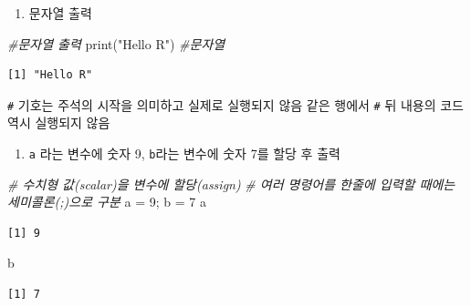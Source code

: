 \documentclass[
  11pt,
]{krantz}
\makeatletter
\newenvironment{Shaded}{\begin{snugshade}}{\end{snugshade}}
\newcommand{\CommentTok}[1]{\textcolor[rgb]{0.37,0.37,0.37}{\textit{#1}}}
\newcommand{\DecValTok}[1]{\textcolor[rgb]{0.06,0.06,0.06}{#1}}
\newcommand{\FunctionTok}[1]{\textcolor[rgb]{0,0,0}{#1}}
\newcommand{\NormalTok}[1]{#1}
\newcommand{\OtherTok}[1]{\textcolor[rgb]{0.37,0.37,0.37}{#1}}
\newcommand{\StringTok}[1]{\textcolor[rgb]{0.5,0.5,0.5}{#1}}
\providecommand{\tightlist}{%
  \setlength{\itemsep}{0pt}\setlength{\parskip}{0pt}}
\newenvironment{kframe}{%
\medskip{}
\setlength{\fboxsep}{.8em}
 \def\at@end@of@kframe{}%
 \ifinner\ifhmode%
  \def\at@end@of@kframe{\end{minipage}}%
  \begin{minipage}{\columnwidth}%
 \fi\fi%
 \def\FrameCommand##1{\hskip\@totalleftmargin \hskip-\fboxsep
 \colorbox{shadecolor}{##1}\hskip-\fboxsep
     \hskip-\linewidth \hskip-\@totalleftmargin \hskip\columnwidth}%
 \MakeFramed {\advance\hsize-\width
   \@totalleftmargin\z@ \linewidth\hsize
   \@setminipage}}%
 {\par\unskip\endMakeFramed%
 \at@end@of@kframe}
\renewenvironment{quote}{\begin{kframe}}{\end{kframe}}
\makeatother
\begin{document}
\begin{enumerate}
\def\labelenumi{\arabic{enumi}.}
\setcounter{enumi}{1}
\tightlist
\item
  문자열 출력
\end{enumerate}

\footnotesize

\begin{Shaded}
\begin{Highlighting}[]
\CommentTok{\#문자열 출력}
\FunctionTok{print}\NormalTok{(}\StringTok{"Hello R"}\NormalTok{) }\CommentTok{\#문자열}
\end{Highlighting}
\end{Shaded}

\begin{verbatim}
[1] "Hello R"
\end{verbatim}

\normalsize

\begin{quote}
\texttt{\#} 기호는 주석의 시작을 의미하고 실제로 실행되지 않음 같은 행에서 \texttt{\#} 뒤 내용의 코드 역시 실행되지 않음
\end{quote}

\begin{enumerate}
\def\labelenumi{\arabic{enumi}.}
\setcounter{enumi}{2}
\tightlist
\item
  \texttt{a} 라는 변수에 숫자 9, \texttt{b}라는 변수에 숫자 7를 할당 후 출력
\end{enumerate}

\footnotesize

\begin{Shaded}
\begin{Highlighting}[]
\CommentTok{\# 수치형 값(scalar)을 변수에 할당(assign)}
\CommentTok{\# 여러 명령어를 한줄에 입력할 때에는 세미콜론(;)으로 구분}
\NormalTok{a }\OtherTok{=} \DecValTok{9}\NormalTok{; b }\OtherTok{=} \DecValTok{7}
\NormalTok{a}
\end{Highlighting}
\end{Shaded}

\begin{verbatim}
[1] 9
\end{verbatim}

\begin{Shaded}
\begin{Highlighting}[]
\NormalTok{b}
\end{Highlighting}
\end{Shaded}

\begin{verbatim}
[1] 7
\end{verbatim}
\end{document}
